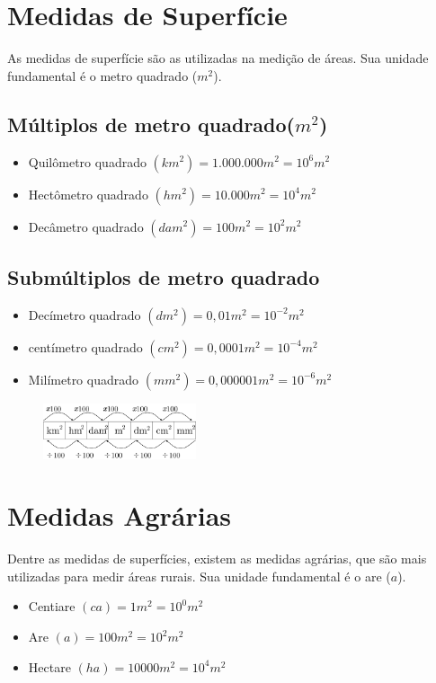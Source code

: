 \section{Medidas de Superfície}
As medidas de superfície são as utilizadas na medição de
áreas. Sua unidade fundamental é o metro quadrado ($m^2$).
    \subsection{Múltiplos de metro quadrado($m^2$)}
		\begin{itemize}
			\item Quilômetro quadrado $(km^2) = 1.000.000 m^2 = 10^6 m^2$
			\item Hectômetro quadrado $(hm^2) = 10.000 m^2 = 10^4 m^2$
			\item Decâmetro quadrado $(dam^2) = 100 m^2 = 10^2 m^2$
		\end{itemize}
		
\newpage
	\subsection{Submúltiplos de metro quadrado}
		\begin{itemize}
			\item Decímetro quadrado $(dm^2) = 0,01m^2 = 10^{-2}m^2$
			\item centímetro quadrado $(cm^2) = 0,0001m^2 = 10^{-4}m^2$
			\item Milímetro quadrado $(mm^2)= 0,000001m^2 = 10^{-6}m^2$
		\end{itemize}

    \begin{figure}[!h]
		    \centering 
            \includegraphics[width=0.4\textwidth]{imagens/matematicaBasica/sistemaDeUnidades/MultiplosDeMetroQuadrado.pdf}
		\end{figure}
		
\section{Medidas Agrárias}
Dentre as medidas de superfícies, existem as medidas
agrárias, que são mais utilizadas para medir áreas rurais. Sua
unidade fundamental é o are ($a$).
	\begin{itemize}
		\item Centiare $(ca) = 1m^{2}=10^{0}m^{2}$
		\item Are $(a)= 100m^{2} = 10^{2}m^{2}$
		\item Hectare $(ha) = 10000m^{2} = 10^{4}m^{2}$
	\end{itemize}

